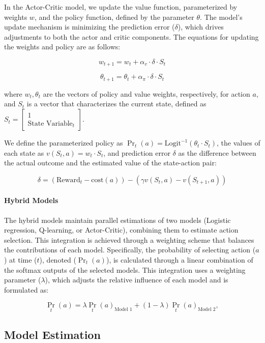 \documentclass[
  number,
  preprint,
  3p,
  onecolumn]{elsarticle}
\let\oldparagraph\paragraph
\renewcommand{\paragraph}[1]{\oldparagraph{#1}\mbox{}}
\begin{document}
In the Actor-Critic model, we update the value function, parameterized
by weights \(w\), and the policy function, defined by the parameter
\(\theta\). The model's update mechanism is minimizing the prediction
error (\(\delta\)), which drives adjustments to both the actor and
critic components. The equations for updating the weights and policy are
as follows:

\[
w_{t+1} = w_{t} + \alpha_{v} \cdot \delta \cdot S_{t}
\]

\[
\theta_{t+1} = \theta_{t} + \alpha_{\pi} \cdot \delta \cdot S_{t}
\]

where \(w_{t}, \theta_{t}\) are the vectors of policy and value weights,
respectively, for action \(a\), and \(S_{t}\) is a vector that
characterizes the current state, defined as
\(S_{t} = \begin{bmatrix} 1 \\ \text{State Variable}_{t} \end{bmatrix}\).

We define the parameterized policy as
\(\Pr_{t}(a)=\text{Logit}^{-1}(\theta_{t} \cdot S_{t})\), the values of
each state as \(v(S_{t},a) = w_{t} \cdot S_{t}\), and prediction error
\(\delta\) as the difference between the actual outcome and the
estimated value of the state-action pair:

\[
\delta = (\text{Reward}_{t} - \text{cost}(a)) - \left( \gamma v(S_{t},a) - v(S_{t+1},a) \right)
\]

\paragraph{Hybrid Models}\label{hybrid-models}

The hybrid models maintain parallel estimations of two models (Logistic
regression, Q-learning, or Actor-Critic), combining them to estimate
action selection. This integration is achieved through a weighting
scheme that balances the contributions of each model. Specifically, the
probability of selecting action (\(a\)) at time (\(t\)), denoted
(\(\Pr_t(a)\)), is calculated through a linear combination of the
softmax outputs of the selected models. This integration uses a
weighting parameter (\(\lambda\)), which adjusts the relative influence
of each model and is formulated as:

\[
\Pr_t(a) = \lambda \Pr_t(a)_{\text{Model 1}} + (1-\lambda) \Pr_t(a)_{\text{Model 2}},
\]

\subsection{Model Estimation}\label{model-estimation}
\end{document}
